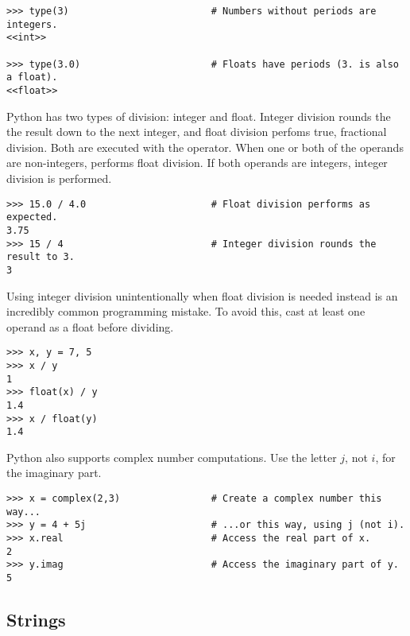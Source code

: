 \begin{lstlisting}
>>> type(3)                         # Numbers without periods are integers.
<<int>>

>>> type(3.0)                       # Floats have periods (3. is also a float).
<<float>>
\end{lstlisting}

Python has two types of division: integer and float.
Integer division rounds the the result down to the next integer, and float division perfoms true, fractional division.
Both are executed  with the \li{/} operator.
When one or both of the operands are non-integers, \li{/} performs float division.
If both operands are integers, integer division is performed.

\begin{lstlisting}
>>> 15.0 / 4.0                      # Float division performs as expected.
3.75
>>> 15 / 4                          # Integer division rounds the result to 3.
3
\end{lstlisting}

\begin{warn} %
Using integer division unintentionally when float division is needed instead is an incredibly common programming mistake.
To avoid this, cast at least one operand as a float before dividing.
\begin{lstlisting}
>>> x, y = 7, 5
>>> x / y
1
>>> float(x) / y
1.4
>>> x / float(y)
1.4
\end{lstlisting}
\end{warn}

Python also supports complex number computations.
Use the letter $j$, not $i$, for the imaginary part.
\begin{lstlisting}
>>> x = complex(2,3)                # Create a complex number this way...
>>> y = 4 + 5j	                    # ...or this way, using j (not i).
>>> x.real                          # Access the real part of x.
2
>>> y.imag                          # Access the imaginary part of y.
5
\end{lstlisting}

\subsection*{Strings} %

